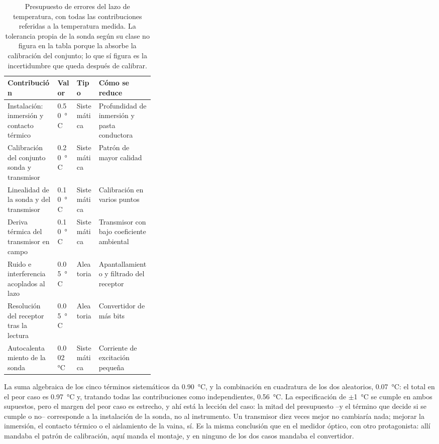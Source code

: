 \begin{table}[ht]
    \centering
    \small
    \setlength{\tabcolsep}{3pt}
    \forceversofloat %
    \begin{tabularx}{\linewidth}{@{} L{0.34\linewidth} >{\centering\arraybackslash}X >{\centering\arraybackslash}X >{\centering\arraybackslash}X @{}}
        \toprule
        \textbf{Contribución} & \textbf{Valor} & \textbf{Tipo} & \textbf{Cómo se reduce} \\
        \midrule
        Instalación: inmersión y contacto térmico & \SI{0.50}{\celsius} & Sistemática & Profundidad de inmersión y pasta conductora \\
        Calibración del conjunto sonda y transmisor & \SI{0.20}{\celsius} & Sistemática & Patrón de mayor calidad \\
        Linealidad de la sonda y del transmisor & \SI{0.10}{\celsius} & Sistemática & Calibración en varios puntos \\
        Deriva térmica del transmisor en campo & \SI{0.10}{\celsius} & Sistemática & Transmisor con bajo coeficiente ambiental \\
        Ruido e interferencia acoplados al lazo & \SI{0.05}{\celsius} & Aleatoria & Apantallamiento y filtrado del receptor \\
        Resolución del receptor tras la lectura & \SI{0.05}{\celsius} & Aleatoria & Convertidor de más bits \\
        Autocalentamiento de la sonda & \SI{0.002}{\celsius} & Sistemática & Corriente de excitación pequeña \\
        \bottomrule
    \end{tabularx}
    \caption[Presupuesto de errores del lazo de temperatura.]{Presupuesto de errores del lazo de temperatura, con todas las contribuciones referidas a la temperatura medida. La tolerancia propia de la sonda según su clase no figura en la tabla porque la absorbe la calibración del conjunto; lo que sí figura es la incertidumbre que queda después de calibrar.\protect\label{tab:temperatura_presupuesto}}
\end{table}

La suma algebraica de los cinco términos sistemáticos da \SI{0.90}{\celsius}, y la combinación en cuadratura de los dos aleatorios, \SI{0.07}{\celsius}: el total en el peor caso es \SI{0.97}{\celsius} y, tratando todas las contribuciones como independientes, \SI{0.56}{\celsius}. La especificación de $\pm$\SI{1}{\celsius} se cumple en ambos supuestos, pero el margen del peor caso es estrecho, y ahí está la lección del caso: la mitad del presupuesto --y el término que decide si se cumple o no-- corresponde a la instalación de la sonda, no al instrumento. Un transmisor diez veces mejor no cambiaría nada; mejorar la inmersión, el contacto térmico o el aislamiento de la vaina, sí. Es la misma conclusión que en el medidor óptico, con otro protagonista: allí mandaba el patrón de calibración, aquí manda el montaje, y en ninguno de los dos casos mandaba el convertidor.

